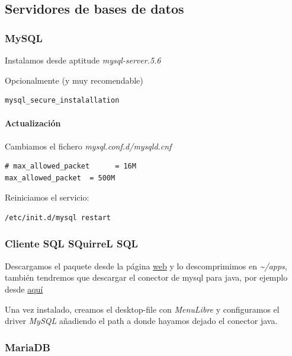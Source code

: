 \documentclass[12pt,spanish,]{article}
\let\oldparagraph\paragraph
\renewcommand{\paragraph}[1]{\oldparagraph{#1}\mbox{}}
\begin{document}
\subsection{Servidores de bases de
datos}\label{servidores-de-bases-de-datos}

\subsubsection{MySQL}\label{mysql}

Instalamos desde aptitude \emph{mysql-server.5.6}

Opcionalmente (y muy recomendable)

\begin{verbatim}
mysql_secure_instalallation
\end{verbatim}

\paragraph{Actualización}\label{actualizaciuxf3n}

Cambiamos el fichero \emph{mysql.conf.d/mysqld.cnf}

\begin{verbatim}
# max_allowed_packet      = 16M
max_allowed_packet  = 500M
\end{verbatim}

Reiniciamos el servicio:

\begin{verbatim}
/etc/init.d/mysql restart
\end{verbatim}

\subsubsection{Cliente SQL SQuirreL SQL}\label{cliente-sql-squirrel-sql}

Descargamos el paquete desde la página
\href{http://squirrel-sql.sourceforge.net/}{web} y lo descomprimimos en
\emph{\textasciitilde{}/apps}, también tendremos que descargar el
conector de mysql para java, por ejemplo desde
\href{http://dev.mysql.com/downloads/connector/j/3.0.html}{aquí}

Una vez instalado, creamos el desktop-file con \emph{MenuLibre} y
configuramos el driver \emph{MySQL} añadiendo el path a donde hayamos
dejado el conector java.

\subsubsection{MariaDB}\label{mariadb}
\end{document}
